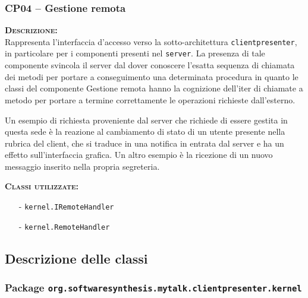 \subsubsection{CP04 -- Gestione remota}
\begin{description}
	\item{\scshape\bfseries Descrizione:}\\
Rappresenta l'interfaccia d'accesso verso la sotto-architettura \texttt{clientpresenter}, in particolare per i componenti presenti nel \texttt{server}. La presenza di tale componente svincola il server dal dover conoscere l'esatta sequenza di chiamata dei metodi per portare a conseguimento una determinata procedura in quanto le classi del componente \textsf{Gestione remota} hanno la cognizione dell'iter di chiamate a metodo per portare a termine correttamente le operazioni richieste dall'esterno.

Un esempio di richiesta proveniente dal server che richiede di essere gestita in questa sede è la reazione al cambiamento di stato di un utente presente nella rubrica del client, che si traduce in una notifica in entrata dal server e ha un effetto sull'interfaccia grafica. Un altro esempio è la ricezione di un nuovo messaggio inserito nella propria segreteria.


	\item{\scshape\bfseries Classi utilizzate:} 
	\begin{itemize}[noitemsep,nolistsep]
		\item[-] \texttt{kernel.IRemoteHandler}
		\item[-] \texttt{kernel.RemoteHandler}
	\end{itemize}
\end{description}

\subsection{Descrizione delle classi}

\subsubsection{Package \texttt{org.softwaresynthesis.mytalk.clientpresenter.kernel}}

